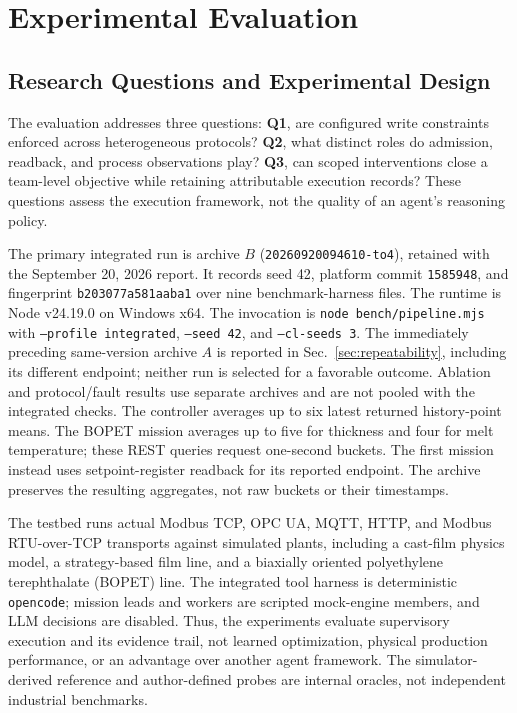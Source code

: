 \section{Experimental Evaluation}
\label{sec:eval}
\subsection{Research Questions and Experimental Design}
\label{sec:protocol}\label{sec:static}
The evaluation addresses three questions: \textbf{Q1}, are configured write
constraints enforced across heterogeneous protocols? \textbf{Q2}, what distinct
roles do admission, readback, and process observations play? \textbf{Q3}, can
scoped interventions close a team-level objective while retaining attributable
execution records? These questions assess the execution framework, not the
quality of an agent's reasoning policy.

The primary integrated run is archive $B$
(\texttt{20260920094610-to4}), retained with the September 20, 2026 report.
It records seed 42, platform commit \texttt{1585948}, and fingerprint
\texttt{b203077a581aaba1} over nine benchmark-harness files. The runtime is
Node v24.19.0 on Windows x64. The invocation is
\texttt{node bench/pipeline.mjs} with \texttt{--profile integrated},
\texttt{--seed 42}, and \texttt{--cl-seeds 3}. The immediately preceding
same-version archive $A$ is reported in Sec.~\ref{sec:repeatability}, including
its different endpoint; neither run is selected for a favorable outcome.
Ablation and protocol/fault results use separate archives and are not pooled
with the integrated checks.
The controller averages up to six latest returned history-point means. The
BOPET mission averages up to five for thickness and four for melt temperature;
these REST queries request one-second buckets. The first mission instead
uses setpoint-register readback for its reported endpoint. The archive
preserves the resulting aggregates, not raw buckets or their timestamps.

The testbed runs actual Modbus TCP, OPC UA, MQTT, HTTP, and Modbus
RTU-over-TCP transports against simulated plants, including a cast-film
physics model, a strategy-based film line, and a biaxially oriented
polyethylene terephthalate (BOPET) line. The integrated tool harness is
deterministic \texttt{opencode}; mission leads and workers are scripted
mock-engine members, and LLM decisions are disabled. Thus, the experiments
evaluate supervisory execution and its evidence trail, not learned
optimization, physical production performance, or an advantage over another
agent framework. The simulator-derived reference and author-defined probes
are internal oracles, not independent industrial benchmarks.

